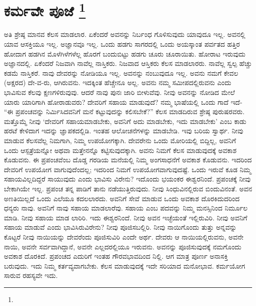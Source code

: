 
\chapter[ಕರ್ಮವೇ ಪೂಜೆ ]{ಕರ್ಮವೇ ಪೂಜೆ \protect\footnote{}}

ಅತಿ ಶ್ರೇಷ್ಠ ಮಾನವ ಕೆಲಸ ಮಾಡಲಾರ. ಏಕೆಂದರೆ ಅವನನ್ನು ನಿರ್ಬಂಧ ಗೊಳಿಸುವುದು ಯಾವುದೂ ಇಲ್ಲ. ಅವನಲ್ಲಿ ಯಾವ ಆಸಕ್ತಿಯೂ ಇಲ್ಲ. ಅಜ್ಞಾನವೂ ಇಲ್ಲ. ಒಂದು ಹಡಗು ಸಾಗರದಲ್ಲಿ ಒಂದು ಅಯಸ್ಕಾಂತ ಪರ್ವತದ ಹತ್ತಿರ ಹೋದಾಗ ಹಡಗಿನ ಮೊಳೆಗಿಳೆಗಳೆಲ್ಲ ಹೊರಗೆ ಬಂದುಬಿಟ್ಟು ಹಡಗು ಚೂರು ಚೂರಾಯಿತು. ಹೋರಾಟ ಇರುವುದು ಅಜ್ಞಾನದಲ್ಲಿ. ಏಕೆಂದರೆ ನಿಜವಾಗಿ ನಾವೆಲ್ಲ ನಾಸ್ತಿಕರು. ನಿಜವಾದ ಆಸ್ತಿಕರು ಕೆಲಸ ಮಾಡಲಾರರು. ನಾವೆಲ್ಲ ಸ್ವಲ್ಪ ಹೆಚ್ಚು ಕಡಮೆ ನಾಸ್ತಿಕರೆ. ನಾವು ದೇವರನ್ನು ನೋಡಿಯೂ ಇಲ್ಲ. ಅವನನ್ನು ನಂಬುವುದೂ ಇಲ್ಲ. ಅವನು ನಮಗೆ ಕೇವಲ (ಅಕ್ಷರದ) ದೇ-ವ-ರು, ಆಗಿರುವನು. ಇದಕ್ಕಿಂತ ಹೆಚ್ಚೇನೂ ಅಲ್ಲ. ಅವನು ನಮ್ಮ ಸಮೀಪದಲ್ಲಿರುವನು ಎಂದು ಭಾವಿಸುವ ಕೆಲವು ಕ್ಷಣಗಳಿರುವುವು. ಆದರೆ ನಾವು ಪುನಃ ಜಾರಿ ಬೀಳುವೆವು. ನೀವು ಅವನನ್ನು ನೋಡಿದ ಮೇಲೆ ಯಾರು ಯಾರಿಗಾಗಿ ಹೋರಾಡುವರು? ದೇವರಿಗೆ ಸಹಾಯ ಮಾಡುವುದೆ? ನಮ್ಮ ಭಾಷೆಯಲ್ಲಿ ಒಂದು ಗಾದೆ ಇದೆ- “ಈ ಪ್ರಪಂಚವನ್ನು ನಿರ್ಮಿಸಿದವನಿಗೆ ಮನೆ ಕಟ್ಟುವುದನ್ನು ಕಲಿಸಬೇಕೆ?” ಕೆಲಸ ಮಾಡದಿರುವ ಶ್ರೇಷ್ಠ ಪುರುಷರವರು. ಮತ್ತೊಮ್ಮೆ ನೀವು ‘ದೇವರಿಗೆ ಸಹಾಯಮಾಡಬೇಕು, ಅವನಿಗೆ ಅದು ಮಾಡಬೇಕು, ಇದು ಮಾಡಬೇಕು’ ಎಂಬ ಕಾಡು ಹರಟೆ ಕೇಳಿದಾಗ ಇದನ್ನು ಜ್ಞಾಪಕದಲ್ಲಿಡಿ. ಇಂತಹ ಆಲೋಚನೆಗಳನ್ನು ಮಾಡಬೇಡಿ. ಇವು ಬರಿಯ ಸ್ವಾರ್ಥ. ನೀವು ಮಾಡುವ ಕೆಲಸವೆಲ್ಲ ನಿಮಗಾಗಿ, ನಿಮ್ಮ ಉಪಯೋಗಕ್ಕಾಗಿ. ದೇವರೇನು ಒಂದು ಮೋರಿಯಲ್ಲಿ ಬಿದ್ದಿಲ್ಲ, ಅವನಿಗೆ ಒಂದು ಆಸ್ಪತ್ರೆಯನ್ನೋ ಅಥವಾ ಮತ್ತೇನನ್ನೊ ಕಟ್ಟಿಸುವುದಕ್ಕಾಗಿ. ಅವನು ನಿಮಗೆ ಕೆಲಸ ಮಾಡುವುದಕ್ಕೆ ಅವಕಾಶ ಕೊಡುವನು. ಈ ಪ್ರಪಂಚವೆಂಬ ದೊಡ್ಡ ಗರಡಿಯ ಮನೆಯಲ್ಲಿ ನಿಮ್ಮ ಅಂಗಸಾಧನೆಗೆ ಅವಕಾಶ ಕೊಡುವನು. ಇದರಿಂದ ದೇವರಿಗೆ ಉಪಯೋಗ ವಾಗುವುದೆಂದಲ್ಲ; ಇದರಿಂದ ನಿಮಗೆ ಉಪಯೋಗವಾಗುವುದಷ್ಟೆ. ಒಂದು ಇರುವೆ ಕೂಡ ನಿಮ್ಮ ಸಹಾಯವಿಲ್ಲದಿದ್ದರೆ ಸಾಯುವುದು ಎಂದು ಭಾವಿಸು ವಿರೇನು? ಇದೊಂದು ಭಯಂಕರ ಈಶ್ವರನಿಂದೆ. ಪ್ರಪಂಚಕ್ಕೆ ನೀವು ಬೇಕಾಗಿಯೇ ಇಲ್ಲ. ಪ್ರಪಂಚ ತನ್ನ ಪಾಡಿಗೆ ತಾನು ನಡೆಯುತ್ತಿರುವುದು. ನೀವು ಸಿಂಧುವಿನಲ್ಲಿರುವ ಬಿಂದುವಿನಂತೆ. ಅವನ ಅಣತಿಯಿಲ್ಲದೆ ಒಂದು ಎಲೆಯೂ ಕದಲಲಾರದು. ಅವನಿಗೆ ಸೇವೆ ಮಾಡುವ ಒಂದು ಅವಕಾಶ ದೊರಕಿದುದರಿಂದ ಧನ್ಯರು ನಾವು. ಅವನಿಗೆ ನಾವು ಸಹಾಯ ಮಾಡಲಾರೆವು. ಸಹಾಯ ಎಂಬ ಪದವನ್ನು ನಿಮ್ಮ ಮನಸ್ಸಿನಿಂದ ನಿರ್ಮೂಲ ಮಾಡಿ. ನೀವು ಸಹಾಯ ಮಾಡ ಲಾರಿರಿ. ಇದು ಈಶ್ವರನಿಂದೆ. ನೀವು ಅವನ ಇಚ್ಛೆಯಂತೆ ಇಲ್ಲಿರುವಿರಿ. ನೀವು ಅವನಿಗೆ ಸಹಾಯ ಮಾಡುವೆ ಎಂದು ಭಾವಿಸಿರುವಿರೇನು? ನೀವು ಪೂಜಿಸಬಲ್ಲಿರಿ. ನೀವು ನಾಯಿಗೊಂದು ತುತ್ತು ಅನ್ನವನ್ನು ಕೊಟ್ಟರೆ ನೀವು ನಾಯಿಯನ್ನು ದೇವರೆಂದು ಪೂಜಿಸುವಿರಿ ಎಂದೇ ಅರ್ಥ. ದೇವರು ಆ ನಾಯಿಯಲ್ಲಿರುವನು, ಅವನೇ ನಾಯಿ, ಅವನೇ ಸರ್ವವಾಗಿದ್ದಾನೆ, ಅವನೇ ಎಲ್ಲದರಲ್ಲಿಯೂ ಇರುವನು. ಅವನನ್ನು ಪೂಜಿಸುವುದಕ್ಕೆ ನಮಗೊಂದು ಅವಕಾಶ ದೊರಕಿದೆ. ಪ್ರಪಂಚದ ಎದುರಿಗೆ ಇಂತಹ ಗೌರವಭಾವದಿಂದ ನಿಲ್ಲಿ. ಆಗ ಮಾತ್ರ ಪೂರ್ಣ ಅನಾಸಕ್ತಿ ಬರುವುದು. ಇದು ನಿಮ್ಮ ಕರ್ತವ್ಯವಾಗಬೇಕು. ಕೆಲಸ ಮಾಡುವುದಕ್ಕೆ ಇದೇ ಸರಿಯಾದ ಮನೋಭಾವ. ಕರ್ಮಯೋಗ ಸಾರುವ ರಹಸ್ಯವೇ ಇದು.

